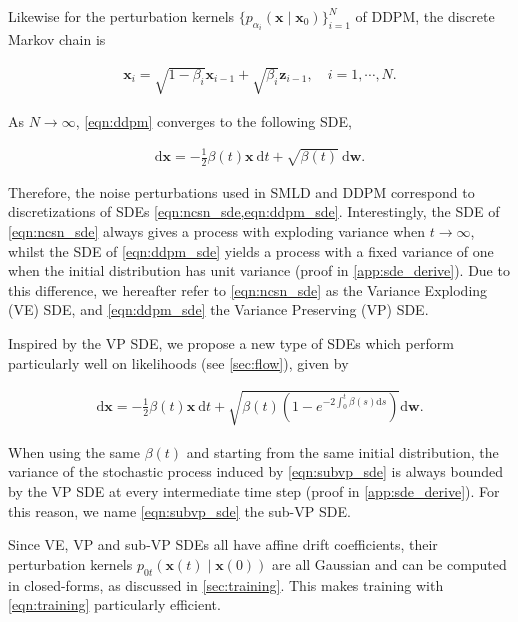 Likewise for the perturbation kernels $\{p_{\alpha_i}(\mathbf{x} \mid \mathbf{x}_0)\}_{i=1}^N$ of DDPM, the discrete Markov chain is

\begin{align}
    \mathbf{x}_i = \sqrt{1-\beta_{i}} \mathbf{x}_{i-1} + \sqrt{\beta_{i}} \mathbf{z}_{i-1}, \quad i=1,\cdots,N. \label{eqn:ddpm}
\end{align}

As $N\to \infty$, \ref{eqn:ddpm} converges to the following SDE,

\begin{align}
\mathrm{d} \mathbf{x} = -\frac{1}{2}\beta(t) \mathbf{x}~ \mathrm{d} t + \sqrt{\beta(t)} ~\mathrm{d} \mathbf{w}. \label{eqn:ddpm_sde}
\end{align}

Therefore, the noise perturbations used in SMLD and DDPM correspond to discretizations of SDEs \ref{eqn:ncsn_sde,eqn:ddpm_sde}. Interestingly, the SDE of \ref{eqn:ncsn_sde} always gives a process with exploding variance when $t \to \infty$, whilst the SDE of \ref{eqn:ddpm_sde} yields a process with a fixed variance of one when the initial distribution has unit variance (proof in \ref{app:sde_derive}). Due to this difference, we hereafter refer to \ref{eqn:ncsn_sde} as the Variance Exploding (VE) SDE, and \ref{eqn:ddpm_sde} the Variance Preserving (VP) SDE. 

Inspired by the VP SDE, we propose a new type of SDEs which perform particularly well on likelihoods (see \ref{sec:flow}), given by

\begin{align}
    \mathrm{d} \mathbf{x} = -\frac{1}{2}\beta(t) \mathbf{x}~ \mathrm{d} t + \sqrt{\beta(t)(1 - e^{-2\int_0^t \beta(s)\mathrm{d} s})} \mathrm{d} \mathbf{w}.\label{eqn:subvp_sde}
\end{align}

When using the same $\beta(t)$ and starting from the same initial distribution, the variance of the stochastic process induced by \ref{eqn:subvp_sde} is always bounded by the VP SDE at every intermediate time step (proof in \ref{app:sde_derive}). For this reason, we name \ref{eqn:subvp_sde} the sub-VP SDE.

Since VE, VP and sub-VP SDEs all have affine drift coefficients, their perturbation kernels $p_{0t}(\mathbf{x}(t) \mid \mathbf{x}(0))$ are all Gaussian and can be computed in closed-forms, as discussed in \ref{sec:training}. This makes training with \ref{eqn:training} particularly efficient. 

